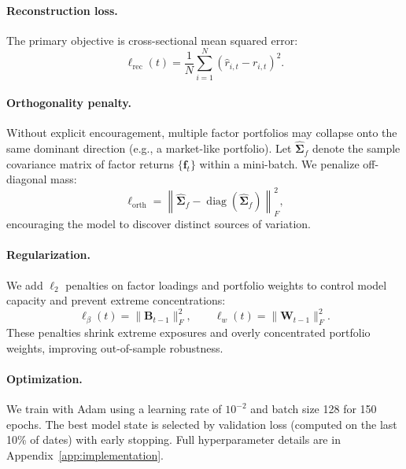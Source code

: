 \paragraph{Reconstruction loss.} The primary objective is cross-sectional mean squared error:
\begin{equation}\label{eq:rec-loss}
    \ell_{\mathrm{rec}}(t) = \frac{1}{N}\sum_{i=1}^{N} \left(\hat{r}_{i,t} - r_{i,t}\right)^2.
\end{equation}

\paragraph{Orthogonality penalty.} Without explicit encouragement, multiple factor portfolios may collapse onto the same dominant direction (e.g., a market-like portfolio). Let $\widehat{\boldsymbol{\Sigma}}_f$ denote the sample covariance matrix of factor returns $\{\mathbf{f}_t\}$ within a mini-batch. We penalize off-diagonal mass:
\begin{equation}\label{eq:orth-loss}
    \ell_{\mathrm{orth}} = \left\|\widehat{\boldsymbol{\Sigma}}_f - \operatorname{diag}\!\left(\widehat{\boldsymbol{\Sigma}}_f\right)\right\|_F^2,
\end{equation}
encouraging the model to discover distinct sources of variation.

\paragraph{Regularization.} We add $\ell_2$ penalties on factor loadings and portfolio weights to control model capacity and prevent extreme concentrations:
\begin{equation}\label{eq:reg}
    \ell_{\beta}(t) = \|\mathbf{B}_{t-1}\|_F^2, \qquad \ell_{w}(t) = \|\mathbf{W}_{t-1}\|_F^2.
\end{equation}
These penalties shrink extreme exposures and overly concentrated portfolio weights, improving out-of-sample robustness.

\paragraph{Optimization.} We train with Adam \citep{Kingma2015Adam} using a learning rate of $10^{-2}$ and batch size 128 for 150 epochs. The best model state is selected by validation loss (computed on the last 10\% of dates) with early stopping. Full hyperparameter details are in Appendix~\ref{app:implementation}.


